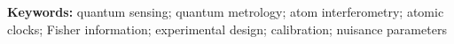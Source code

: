 \documentclass[12pt,a4paper]{article}
\newcommand{\keywords}[1]{\vspace{0.7em}\noindent\textbf{Keywords:} #1}
\begin{document}
\keywords{quantum sensing; quantum metrology; atom interferometry; atomic clocks; Fisher information; experimental design; calibration; nuisance parameters}







\end{document}
